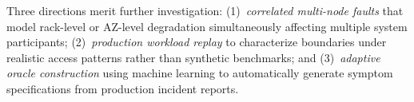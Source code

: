  Three directions merit further investigation:
(1)~\emph{correlated multi-node faults} that model rack-level or AZ-level
degradation simultaneously affecting multiple system participants;
(2)~\emph{production workload replay} to characterize boundaries under
realistic access patterns rather than synthetic benchmarks; and
(3)~\emph{adaptive oracle construction} using machine learning to
automatically generate symptom specifications from production incident reports.
